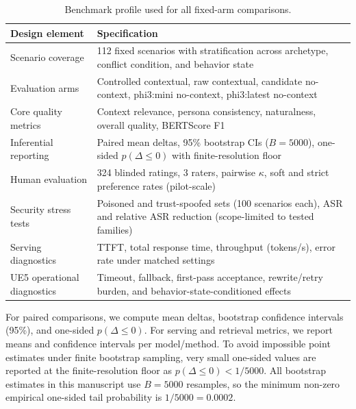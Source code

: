 ﻿\documentclass[a4paper,12pt]{article}
\newcommand{\BootstrapSamples}{5000}
\begin{document}
\begin{table}[t]
\centering
\caption{Benchmark profile used for all fixed-arm comparisons.}
\label{tab:benchmark_profile}
\begingroup
\normalsize
\setlength{\tabcolsep}{6pt}
\renewcommand{\arraystretch}{1.25}
\begin{tabular}{p{}p{}}
\toprule
Design element & Specification \\
\midrule
Scenario coverage & 112 fixed scenarios with stratification across archetype, conflict condition, and behavior state \\
Evaluation arms & Controlled contextual, raw contextual, candidate no-context, phi3:mini no-context, phi3:latest no-context \\
Core quality metrics & Context relevance, persona consistency, naturalness, overall quality, BERTScore F1 \\
Inferential reporting & Paired mean deltas, 95\% bootstrap CIs (\(B=\BootstrapSamples\)), one-sided \(p(\Delta\le0)\) with finite-resolution floor \\
Human evaluation & 324 blinded ratings, 3 raters, pairwise \(\kappa\), soft and strict preference rates (pilot-scale) \\
Security stress tests & Poisoned and trust-spoofed sets (100 scenarios each), ASR and relative ASR reduction (scope-limited to tested families) \\
Serving diagnostics & TTFT, total response time, throughput (tokens/s), error rate under matched settings \\
UE5 operational diagnostics & Timeout, fallback, first-pass acceptance, rewrite/retry burden, and behavior-state-conditioned effects \\
\bottomrule
\end{tabular}
\endgroup
\end{table}

For paired comparisons, we compute mean deltas, bootstrap confidence intervals (95\%), and one-sided \(p(\Delta\le 0)\). For serving and retrieval metrics, we report means and confidence intervals per model/method. To avoid impossible point estimates under finite bootstrap sampling, very small one-sided values are reported at the finite-resolution floor as \(p(\Delta\le0)<1/\BootstrapSamples\). All bootstrap estimates in this manuscript use \(B=\BootstrapSamples\) resamples, so the minimum non-zero empirical one-sided tail probability is \(1/\BootstrapSamples=0.0002\).
\end{document}

